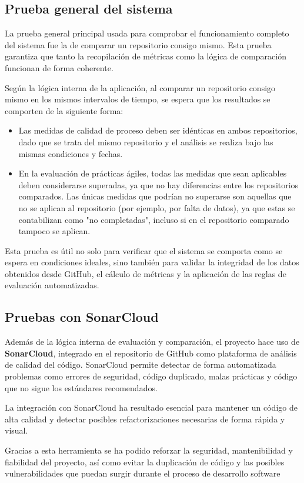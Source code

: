 \subsection{Prueba general del sistema}

La prueba general principal usada para comprobar el funcionamiento completo del sistema fue la de comparar un repositorio consigo mismo. Esta prueba garantiza que tanto la recopilación de métricas como la lógica de comparación funcionan de forma coherente.

Según la lógica interna de la aplicación, al comparar un repositorio consigo mismo en los mismos intervalos de tiempo, se espera que los resultados se comporten de la siguiente forma:

\begin{itemize}
    \item Las medidas de calidad de proceso deben ser idénticas en ambos repositorios, dado que se trata del mismo repositorio y el análisis se realiza bajo las mismas condiciones y fechas.
    
    \item En la evaluación de prácticas ágiles, todas las medidas que sean aplicables deben considerarse superadas, ya que no hay diferencias entre los repositorios comparados. Las únicas medidas que podrían no superarse son aquellas que no se aplican al repositorio (por ejemplo, por falta de datos), ya que estas se contabilizan como "no completadas", incluso si en el repositorio comparado tampoco se aplican.
\end{itemize}

Esta prueba es útil no solo para verificar que el sistema se comporta como se espera en condiciones ideales, sino también para validar la integridad de los datos obtenidos desde GitHub, el cálculo de métricas y la aplicación de las reglas de evaluación automatizadas.

\subsection{Pruebas con SonarCloud}

Además de la lógica interna de evaluación y comparación, el proyecto hace uso de \textbf{SonarCloud}, integrado en el repositorio de GitHub como plataforma de análisis de calidad del código. SonarCloud permite detectar de forma automatizada problemas como errores de seguridad, código duplicado, malas prácticas y código que no sigue los estándares recomendados.

La integración con SonarCloud ha resultado esencial para mantener un código de alta calidad y detectar posibles refactorizaciones necesarias de forma rápida y visual.

Gracias a esta herramienta se ha podido reforzar la seguridad, mantenibilidad y fiabilidad del proyecto, así como evitar la duplicación de código y las posibles vulnerabilidades que puedan surgir durante el proceso de desarrollo software